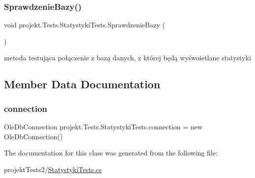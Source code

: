 \subsubsection{\texorpdfstring{Sprawdzenie\+Bazy()}{SprawdzenieBazy()}}
{\footnotesize\ttfamily void projekt.\+Tests.\+Statystyki\+Tests.\+Sprawdzenie\+Bazy (\begin{DoxyParamCaption}{ }\end{DoxyParamCaption})\hspace{0.3cm}{\ttfamily [inline]}}



metoda testująca połączenie z bazą danych, z której będą wyśwoietlane statystyki 



\subsection{Member Data Documentation}
\mbox{\label{classprojekt_1_1_tests_1_1_statystyki_tests_afd97556a71a8fae8cca5c7cdf39dbebe}} 
\subsubsection{\texorpdfstring{connection}{connection}}
{\footnotesize\ttfamily Ole\+Db\+Connection projekt.\+Tests.\+Statystyki\+Tests.\+connection = new Ole\+Db\+Connection()}



The documentation for this class was generated from the following file\+:\begin{DoxyCompactItemize}
\item 
projekt\+Tests2/\mbox{\hyperlink{_statystyki_tests_8cs}{Statystyki\+Tests.\+cs}}\end{DoxyCompactItemize}
